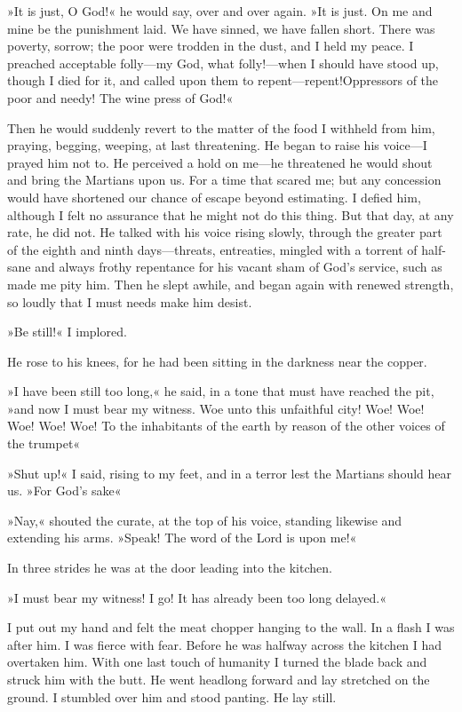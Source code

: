 »It is just, O God!« he would say, over and over again. »It is just. On me and mine be the punishment laid. We have sinned, we have fallen short. There was poverty, sorrow; the poor were trodden in the dust, and I held my peace. I preached acceptable folly—my God, what folly!—when I should have stood up, though I died for it, and called upon them to repent—repent!\textellipsis Oppressors of the poor and needy\textellipsis! The wine press of God!«

Then he would suddenly revert to the matter of the food I withheld from him, praying, begging, weeping, at last threatening. He began to raise his voice—I prayed him not to. He perceived a hold on me—he threatened he would shout and bring the Martians upon us. For a time that scared me; but any concession would have shortened our chance of escape beyond estimating. I defied him, although I felt no assurance that he might not do this thing. But that day, at any rate, he did not. He talked with his voice rising slowly, through the greater part of the eighth and ninth days—threats, entreaties, mingled with a torrent of half-sane and always frothy repentance for his vacant sham of God's service, such as made me pity him. Then he slept awhile, and began again with renewed strength, so loudly that I must needs make him desist.

»Be still!« I implored.

He rose to his knees, for he had been sitting in the darkness near the copper.

»I have been still too long,« he said, in a tone that must have reached the pit, »and now I must bear my witness. Woe unto this unfaithful city! Woe! Woe! Woe! Woe! Woe! To the inhabitants of the earth by reason of the other voices of the trumpet\longdash«

»Shut up!« I said, rising to my feet, and in a terror lest the Martians should hear us. »For God's sake\longdash«

»Nay,« shouted the curate, at the top of his voice, standing likewise and extending his arms. »Speak! The word of the Lord is upon me!«

In three strides he was at the door leading into the kitchen.

»I must bear my witness! I go! It has already been too long delayed.«

I put out my hand and felt the meat chopper hanging to the wall. In a flash I was after him. I was fierce with fear. Before he was halfway across the kitchen I had overtaken him. With one last touch of humanity I turned the blade back and struck him with the butt. He went headlong forward and lay stretched on the ground. I stumbled over him and stood panting. He lay still.

